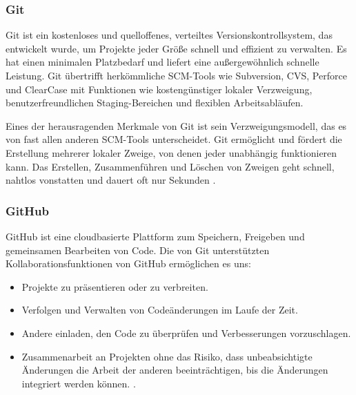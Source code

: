 \subsubsection{Git}
Git ist ein kostenloses und quelloffenes, verteiltes Versionskontrollsystem, das entwickelt wurde, um Projekte jeder Größe schnell und effizient zu verwalten. Es hat einen minimalen Platzbedarf und liefert eine außergewöhnlich schnelle Leistung. Git übertrifft herkömmliche SCM-Tools wie Subversion, CVS, Perforce und ClearCase mit Funktionen wie kostengünstiger lokaler Verzweigung, benutzerfreundlichen Staging-Bereichen und flexiblen Arbeitsabläufen.

Eines der herausragenden Merkmale von Git ist sein Verzweigungsmodell, das es von fast allen anderen SCM-Tools unterscheidet. Git ermöglicht und fördert die Erstellung mehrerer lokaler Zweige, von denen jeder unabhängig funktionieren kann. Das Erstellen, Zusammenführen und Löschen von Zweigen geht schnell, nahtlos vonstatten und dauert oft nur Sekunden  \cite{git-scmr:o.J}.

\subsubsection{GitHub}
GitHub ist eine cloudbasierte Plattform zum Speichern, Freigeben und gemeinsamen Bearbeiten von Code. Die von Git unterstützten Kollaborationsfunktionen von GitHub ermöglichen es uns:

\begin{itemize}
	\item Projekte zu präsentieren oder zu verbreiten.
	\item Verfolgen und Verwalten von Codeänderungen im Laufe der Zeit.
	\item Andere einladen, den Code zu überprüfen und Verbesserungen vorzuschlagen.
	\item Zusammenarbeit an Projekten ohne das Risiko, dass unbeabsichtigte Änderungen die Arbeit der anderen beeinträchtigen, bis die Änderungen integriert werden können.  \cite{github:o.J}.
\end{itemize} 














